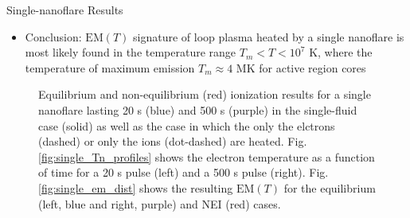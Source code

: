 \documentclass[final]{beamer}
\begin{document}
\begin{frame}
\begin{columns}[t]
\begin{column}{0.49\linewidth}
\begin{block}{Single-nanoflare Results}
\begin{itemize}
\begin{itemize}
          \item In the case in which the ions are heated, no emission is visible above 8 MK, independent of the pulse duration
          \item Calculating $T_{eff}$ due to NEI shows that, even for very short pulses, there is little to no emission visible above 10 MK, for the single-fluid, electron heating, and ion heating cases
        \end{itemize}
        \item Conclusion: \alert{$\mathrm{EM}(T)$ signature of loop plasma heated by a single nanoflare is most likely found in the temperature range $T_m<T<10^7$ K}, where the temperature of maximum emission $T_m\approx4$ MK for active region cores \citep{warren_systematic_2012}
      \end{itemize}
      \vspace{-1ex}
      \begin{figure}
        \caption{Equilibrium and non-equilibrium (red) ionization results for a single nanoflare lasting 20 s (blue) and 500 s (purple) in the single-fluid case (solid) as well as the case in which the only the elctrons (dashed) or only the ions (dot-dashed) are heated. Fig. \ref{fig:single_Tn_profiles} shows the electron temperature as a function of time for a 20 s pulse (left) and a 500 s pulse (right). Fig. \ref{fig:single_em_dist} shows the resulting $\mathrm{EM}(T)$ for the equilibrium (left, blue and right, purple) and NEI (red) cases.}

\end{figure}
\end{block}
\end{column}
\end{columns}
\end{frame}
\end{document}
